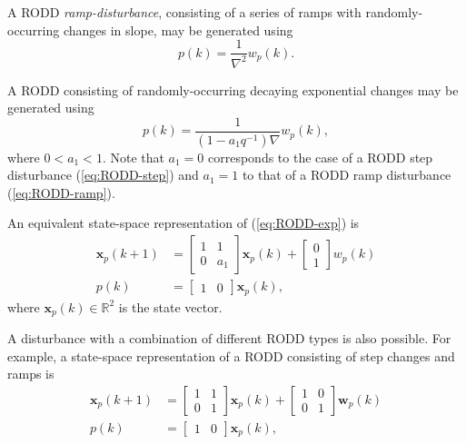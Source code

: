 A RODD \textit{ramp-disturbance}, consisting of a series of ramps with randomly-occurring changes in slope, may be generated using
\begin{equation} \label{eq:RODD-ramp}
	p(k)= \frac{1}{\nabla^2}w_p(k).
\end{equation}

A RODD consisting of randomly-occurring decaying exponential changes may be generated using
\begin{equation} \label{eq:RODD-exp}
	p(k)= \frac{1}{(1-a_1q^{-1})\nabla}w_p(k),
\end{equation}
where  $0<a_1<1$. Note that $a_1=0$ corresponds to the case of a RODD step disturbance (\ref{eq:RODD-step}) and $a_1=1$ to that of a RODD ramp disturbance (\ref{eq:RODD-ramp}). 

An equivalent state-space representation of (\ref{eq:RODD-exp}) is
\begin{equation} \label{eq:RODD-ss}
	\begin{split}
		\mathbf{x}_p(k+1) & =\left[\begin{array}{cc}
			1 & 1 \\
			0 & a_1
		\end{array}\right] \mathbf{x}_p(k) +\left[\begin{array}{cc}
			0 \\
			1
		\end{array}\right] w_p(k) \\
		p(k) & =\left[\begin{array}{cc}
			1 & 0
		\end{array}\right] \mathbf{x}_p(k),
	\end{split}
\end{equation}
where $\mathbf{x}_p(k) \in \mathbb{R}^2$ is the state vector.

A disturbance with a combination of different RODD types is also possible.  For example, a state-space representation of a RODD consisting of step changes and ramps is
\begin{equation} \label{eq:RODD-step-ramp}
	\begin{split}
		\mathbf{x}_p(k+1) & =\left[\begin{array}{cc}
			1 & 1 \\
			0 & 1
		\end{array}\right] \mathbf{x}_p(k) +\left[\begin{array}{cc}
			1 & 0 \\
			0 & 1
		\end{array}\right] \mathbf{w}_p(k) \\
		p(k) & =\left[\begin{array}{cc}
			1 & 0
		\end{array}\right] \mathbf{x}_p(k),
	\end{split}
\end{equation}

